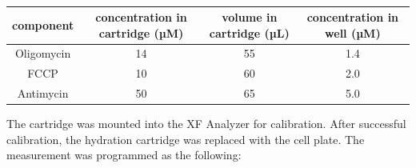     \begin{table}[h]
    \capstart
    \centering
    \begin{minipage}{\captionwidth}
        \caption[toxins for seahorse]{}
        \label{tab:seahorse_toxins}
    \end{minipage}
    \begin{tabular}{|c|c|c|c|}
        \hline
        component  & concentration in cartridge (µM) & volume in cartridge (µL) & concentration in well (µM) \\ \hline
        Oligomycin & 14                             & 55                      & 1.4                        \\
        FCCP       & 10                             & 60                      & 2.0                        \\
        Antimycin  & 50                             & 65                      & 5.0                        \\ \hline
    \end{tabular}
    \end{table}

    The cartridge was mounted into the XF Analyzer for calibration. After successful calibration, the hydration cartridge was replaced with the cell plate. The measurement was programmed as the following:

